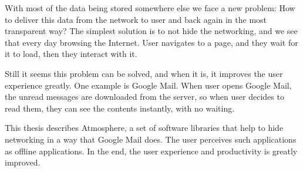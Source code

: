 \documentclass[]{tukethesis}
\begin{document}
With most of the data being stored somewhere else we face a new problem: How to deliver this data from the network to user and back again in the most transparent way? The simplest solution is to not hide the networking, and we see that every day browsing the Internet. User navigates to a page, and they wait for it to load, then they interact with it.

Still it seems this problem can be solved, and when it is, it improves the user experience greatly. One example is Google Mail. When user opens Google Mail, the unread messages are downloaded from the server, so when user decides to read them, they can see the contents instantly, with no waiting. 

This thesis describes Atmosphere, a set of software libraries that help to hide networking in a way that Google Mail does. The user perceives such applications as offline applications. In the end, the user experience and productivity is greatly improved. 
\endpreface

\thispagestyle{empty}
\tableofcontents
\newpage

\thispagestyle{empty}
\listoffigures
\newpage

\thispagestyle{empty}
\listoftables
\newpage

\thispagestyle{empty}
\printglossary %
\newpage

\listofterms %
\end{document}

